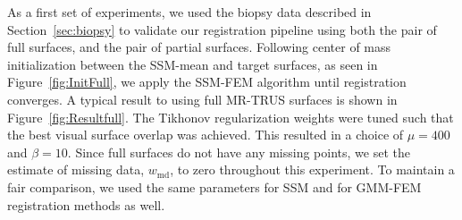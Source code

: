 \documentclass[journal]{IEEEtran}
\begin{document}
As a first set of experiments, we used the biopsy data described in Section~\ref{sec:biopsy} to validate our registration pipeline using both the pair of full surfaces, and the pair of partial surfaces. Following center of mass initialization between the SSM-mean and target surfaces, as seen in Figure~\ref{fig:InitFull}, we apply the SSM-FEM algorithm until registration converges.  A typical result to using full MR-TRUS surfaces is shown in Figure~\ref{fig:Resultfull}. The Tikhonov regularization weights were tuned such that the best visual surface overlap was achieved. This resulted in a choice of $\mu=400$ and $\beta=10$. Since full surfaces do not have any missing points, we set the estimate of missing data, $w_\mathrm{md}$, to zero throughout this experiment. To maintain a fair comparison, we used the same parameters for SSM and for GMM-FEM registration methods as well.
\end{document}

